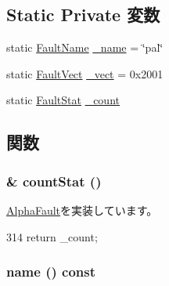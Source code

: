 \subsection*{Static Private 変数}
\begin{DoxyCompactItemize}
\item 
static \hyperlink{sim_2faults_8hh_abb196df64725e5c2568c900cf130d8d7}{FaultName} \hyperlink{classAlphaISA_1_1PalFault_ac79073ffcd2c66a09bcd3bd3ad206019}{\_\-name} = \char`\"{}pal\char`\"{}
\item 
static \hyperlink{classm5_1_1params_1_1Addr}{FaultVect} \hyperlink{classAlphaISA_1_1PalFault_ad9e5855b9db0b2824cf6c507be4a872e}{\_\-vect} = 0x2001
\item 
static \hyperlink{classStats_1_1Scalar}{FaultStat} \hyperlink{classAlphaISA_1_1PalFault_a4bff925c412f331c5aaf6a39b79619ff}{\_\-count}
\end{DoxyCompactItemize}


\subsection{関数}
\hypertarget{classAlphaISA_1_1PalFault_a6c79663c761ff57265459f7e3aefaf4c}{
\subsubsection[{countStat}]{\& countStat ()}}
\label{classAlphaISA_1_1PalFault_a6c79663c761ff57265459f7e3aefaf4c}


\hyperlink{classAlphaISA_1_1AlphaFault_a5d92ccd11b5cd6b04f02bd0a088b776c}{AlphaFault}を実装しています。


\begin{DoxyCode}
314 {return _count;}
\end{DoxyCode}
\hypertarget{classAlphaISA_1_1PalFault_a73adb23259baf912a81683a9790a303f}{
\subsubsection[{name}]{ name () const}}
\label{classAlphaISA_1_1PalFault_a73adb23259baf912a81683a9790a303f}


